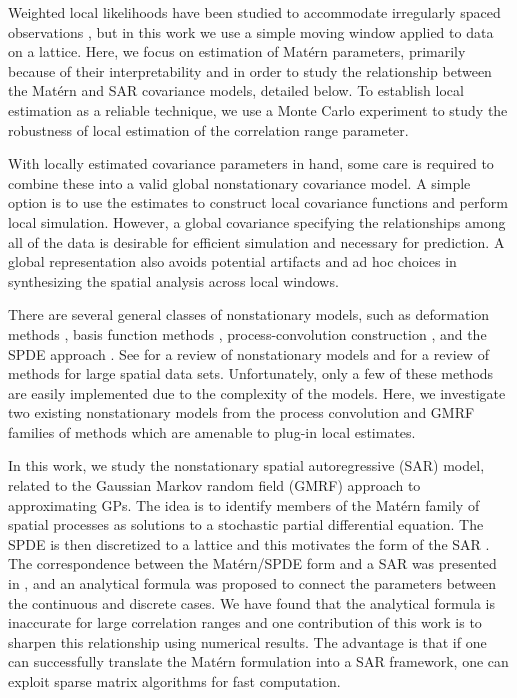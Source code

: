 \documentclass[review]{elsarticle}
\begin{document}
Weighted local likelihoods have been studied to accommodate irregularly spaced observations \cite{anderes2011local}, but in this work we use a simple moving window applied to data on a lattice. Here, we focus on estimation of Mat\'ern parameters, primarily because of their interpretability and in order to study the relationship between the Mat\'ern and SAR covariance models, detailed below. To establish local estimation as a reliable technique, we use a Monte Carlo experiment to study the robustness of local estimation of the correlation range parameter. 

With locally estimated covariance parameters in hand, some care is required to combine these into a valid global nonstationary covariance model. A simple option is to use the estimates to construct local covariance functions and perform local simulation. However, a global covariance specifying the relationships among all of the data is desirable for efficient simulation and necessary for prediction. A global representation also avoids potential artifacts and ad hoc choices in synthesizing the spatial analysis across local windows.



There are several general classes of nonstationary models, such as deformation methods \cite{sampsonguttorp, anderes2008estimating}, basis function methods \cite{cressie2008fixed, katzfuss2011spatio, nychka2015multiresolution, nychka2002multiresolution}, process-convolution construction \cite{higdon1998process, higdon1999non, higdon2002space, paciorek2004nonstationary, fuentes2001new, fuentes2002spectral, zhu2010estimation}, and the SPDE approach \cite{lindgren2011explicit, lindgren2007explicit, simpson2012think, rue2005gaussian}. See \cite{risser2016nonstationary} for a review of nonstationary models and \cite{heaton2017methods} for a review of methods for large spatial data sets. Unfortunately, only a few of these methods are easily implemented due to the complexity of the models. Here, we investigate two existing nonstationary models from the process convolution and GMRF families of methods which are amenable to plug-in local estimates.

In this work, we study the nonstationary spatial autoregressive (SAR) model, related to the Gaussian Markov random field (GMRF) approach to approximating GPs. The idea is to identify members of the Mat\'ern family of spatial processes as solutions to a stochastic partial differential equation. The SPDE is then discretized to a lattice and this motivates the form of the SAR \cite{lindgren2011explicit}. The correspondence between the Mat\'ern/SPDE form and a SAR was presented in \cite{lindgren2011explicit}, and an analytical formula was proposed to connect the parameters between the continuous and discrete cases. We have found that the analytical formula is inaccurate for large correlation ranges and one contribution of this work is to sharpen this relationship using numerical results. The advantage is that if one can successfully translate the Mat\'ern formulation into a SAR framework, one can exploit sparse matrix algorithms for fast computation.
\end{document}
